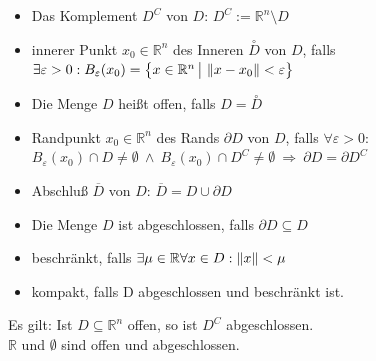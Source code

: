 \documentclass[6pt,a4paper]{scrartcl}
\newcommand{\norm}[2][\relax]{\ifx#1\relax \ensuremath{\left\Vert#2\right\Vert}\else \ensuremath{\left\Vert#2\right\Vert_{#1}}\fi}
\begin{document}
\begin{multicols*}{4}
\begin{itemize}\itemsep0pt
	\item Das Komplement $D^C$ von $D$: $D^C := \mathbb R^n \setminus D$
	\item innerer Punkt $x_0 \in \mathbb R^n$ des Inneren $\overset{\circ}{D}$ von $D$, falls \\
	$\exists \varepsilon > 0: B_\varepsilon (x_0) =
	{\ensuremath{\bigl\{ \bigl. x\in \mathbb R^n \, \bigr| \, \norm{x-x_0} < \varepsilon \bigr\}}}$
	\item Die Menge $D$ heißt offen, falls $D=\overset{\circ}{D}$
	\item Randpunkt $x_0 \in \mathbb R^n$ des Rands $\partial D$ von $D$, falls $\forall \varepsilon > 0:$ \\ 
		$B_\varepsilon(x_0) \cap D \ne \emptyset \ \land \ B_\varepsilon(x_0) \cap D^C \ne \emptyset \ \Rightarrow \ \partial D = \partial D^C$
	\item Abschluß $\overline D$ von $D$: $\overline{D}=D \cup \partial D$
	\item Die Menge $D$ ist abgeschlossen, falls $\partial D \subseteq D$
	\item beschränkt, falls $\exists \mu \in \mathbb R \forall x \in D: \norm{x} < \mu$
	\item kompakt, falls D abgeschlossen und beschränkt ist. 
\end{itemize}
Es gilt: Ist $D \subseteq \mathbb R^n$ offen, so ist $D^C$ abgeschlossen. \\
$\mathbb R$ und $\emptyset$ sind offen und abgeschlossen.



\end{multicols*}


\end{document}

